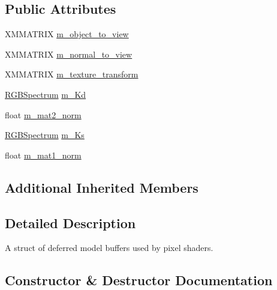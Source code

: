 \subsection*{Public Attributes}
\begin{DoxyCompactItemize}
\item 
X\+M\+M\+A\+T\+R\+IX \hyperlink{structmage_1_1_deferred_model_buffer_a84ee32eb54e80f19bdff68eae22177e8}{m\+\_\+object\+\_\+to\+\_\+view}
\item 
X\+M\+M\+A\+T\+R\+IX \hyperlink{structmage_1_1_deferred_model_buffer_a91287ed74cfb628f459b3ccc2e44ab2b}{m\+\_\+normal\+\_\+to\+\_\+view}
\item 
X\+M\+M\+A\+T\+R\+IX \hyperlink{structmage_1_1_deferred_model_buffer_aff77294d91f1262c4447ef8b923276a1}{m\+\_\+texture\+\_\+transform}
\item 
\hyperlink{structmage_1_1_r_g_b_spectrum}{R\+G\+B\+Spectrum} \hyperlink{structmage_1_1_deferred_model_buffer_aea013f9eb8c80ef6e3f83702286a12fa}{m\+\_\+\+Kd}
\item 
float \hyperlink{structmage_1_1_deferred_model_buffer_a93f058462b55a468c1a345ec0ff8bda5}{m\+\_\+mat2\+\_\+norm}
\item 
\hyperlink{structmage_1_1_r_g_b_spectrum}{R\+G\+B\+Spectrum} \hyperlink{structmage_1_1_deferred_model_buffer_acff69877b5817d1d531cd9e1983e44d2}{m\+\_\+\+Ks}
\item 
float \hyperlink{structmage_1_1_deferred_model_buffer_afbc02a46c53b9c3f6b2f7cd9149b918d}{m\+\_\+mat1\+\_\+norm}
\end{DoxyCompactItemize}
\subsection*{Additional Inherited Members}


\subsection{Detailed Description}
A struct of deferred model buffers used by pixel shaders. 

\subsection{Constructor \& Destructor Documentation}
\hypertarget{structmage_1_1_deferred_model_buffer_a34fee5aa2eb71c488c50c36bb5c90700}{}\label{structmage_1_1_deferred_model_buffer_a34fee5aa2eb71c488c50c36bb5c90700} 
